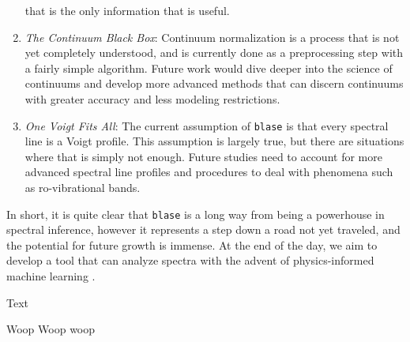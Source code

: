 \documentclass[twocolumn]{aastex631}
\begin{document}
\begin{enumerate}[label=-]
    that is the only information that is useful.
    \item \textit{The Continuum Black Box}: Continuum normalization is a
    process that is not yet completely understood, and is currently done as 
    a preprocessing step with a fairly simple algorithm. Future work would
    dive deeper into the science of continuums and develop more advanced 
    methods that can discern continuums with greater accuracy and less
    modeling restrictions.
    \item \textit{One Voigt Fits All}: The current assumption of \texttt{blase}
    is that every spectral line is a Voigt profile. This assumption is largely
    true, but there are situations where that is simply not enough. Future
    studies need to account for more advanced spectral line profiles and 
    procedures to deal with phenomena such as ro-vibrational bands.
\end{enumerate}
In short, it is quite clear that \texttt{blase} is a long way from being a
powerhouse in spectral inference, however it represents a step down a road
not yet traveled, and the potential for future growth is immense. At the 
end of the day, we aim to develop a tool that can analyze spectra with the 
advent of physics-informed machine learning \citep{test} \citep{test2}.

\begin{acknowledgements}
    Text
\end{acknowledgements}


\begin{thebibliography}{dummy}
     Woop
     Woop woop
\end{thebibliography}
\end{document}
